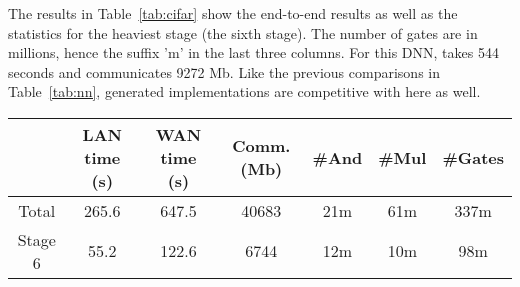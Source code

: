 The results in Table~\ref{tab:cifar} show the end-to-end results as well as the statistics for the heaviest stage (the sixth stage). The number of gates are in millions, hence the suffix 'm' in the last three columns.
For this DNN, \minion takes 544 seconds and communicates 9272 Mb. 
Like the previous comparisons in Table~\ref{tab:nn}, \tool generated implementations are competitive with \minion here as well. 
\begin{table*}
\begin{tabular}{c|c|c|c |c|c|c}
           &  LAN time (s) & WAN time (s) & Comm. (Mb)  & \#And & \#Mul & \#Gates \\
\hline
Total      &  265.6       & 647.5        & 40683       & 21m    & 61m    &  337m  \\
\hline
Stage 6    &  55.2        & 122.6        & 6744        & 12m    & 10m   &  98m  \\
\hline
\end{tabular}

 \caption{Pipelining results}
 \label{tab:cifar} 
\end{table*}

